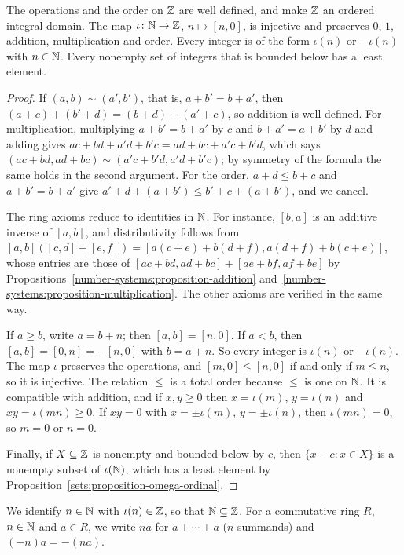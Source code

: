 \begin{theorem}\label{number-systems:theorem-integers}
The operations and the order on $\mathbb{Z}$ are well defined, and make $\mathbb{Z}$ an
ordered integral domain. The map $\iota \colon \mathbb{N} \to \mathbb{Z}$, $n \mapsto [n, 0]$, is
injective and preserves $0$, $1$, addition, multiplication and order. Every
integer is of the form $\iota(n)$ or $-\iota(n)$ with $n \in \mathbb{N}$. Every nonempty
set of integers that is bounded below has a least element.
\end{theorem}

\begin{proof}
If $(a, b) \sim (a', b')$, that is, $a + b' = b + a'$, then
$(a + c) + (b' + d) = (b + d) + (a' + c)$, so addition is well defined. For
multiplication, multiplying $a + b' = b + a'$ by $c$ and $b + a' = a + b'$ by $d$
and adding gives $ac + bd + a'd + b'c = ad + bc + a'c + b'd$, which says
$(ac + bd, ad + bc) \sim (a'c + b'd, a'd + b'c)$; by symmetry of the formula the
same holds in the second argument. For the order, $a + d \leq b + c$ and
$a + b' = b + a'$ give $a' + d + (a + b') \leq b' + c + (a + b')$, and we cancel.

The ring axioms reduce to identities in $\mathbb{N}$. For instance, $[b, a]$ is an
additive inverse of $[a, b]$, and distributivity follows from
$[a, b]([c, d] + [e, f]) = [a(c + e) + b(d + f), a(d + f) + b(c + e)]$, whose
entries are those of $[ac + bd, ad + bc] + [ae + bf, af + be]$ by
Propositions~\ref{number-systems:proposition-addition}
and~\ref{number-systems:proposition-multiplication}. The other axioms are
verified in the same way.

If $a \geq b$, write $a = b + n$; then $[a, b] = [n, 0]$. If $a < b$, then
$[a, b] = [0, n] = -[n, 0]$ with $b = a + n$. So every integer is $\iota(n)$ or
$-\iota(n)$. The map $\iota$ preserves the operations, and $[m, 0] \leq [n, 0]$ if
and only if $m \leq n$, so it is injective. The relation $\leq$ is a total order
because $\leq$ is one on $\mathbb{N}$. It is compatible with addition, and if
$x, y \geq 0$ then $x = \iota(m)$, $y = \iota(n)$ and $xy = \iota(mn) \geq 0$. If
$xy = 0$ with $x = \pm\iota(m)$, $y = \pm\iota(n)$, then $\iota(mn) = 0$, so
$m = 0$ or $n = 0$.

Finally, if $X \subseteq \mathbb{Z}$ is nonempty and bounded below by $c$, then
$\{x - c : x \in X\}$ is a nonempty subset of $\iota(\mathbb{N})$, which has a least
element by Proposition~\ref{sets:proposition-omega-ordinal}.
\end{proof}

\begin{notation}\label{number-systems:notation-integers}
We identify $n \in \mathbb{N}$ with $\iota(n) \in \mathbb{Z}$, so that $\mathbb{N} \subseteq \mathbb{Z}$. For a
commutative ring $R$, $n \in \mathbb{N}$ and $a \in R$, we write $na$ for
$a + \cdots + a$ ($n$ summands) and $(-n)a = -(na)$.
\end{notation}

